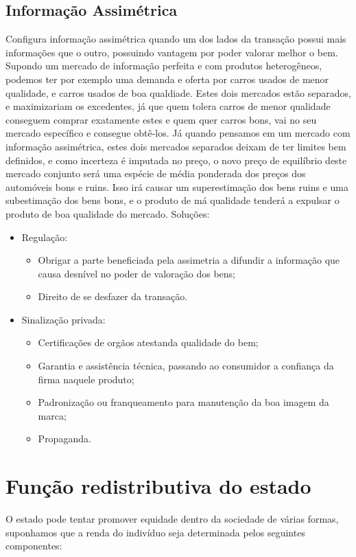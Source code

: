 \documentclass[12pt,a4paper,oneside,brazil]{abntex2}
\begin{document}
\subsection{Informação Assimétrica}
Configura informação assimétrica quando um dos lados da transação possui mais informações que o outro, possuindo vantagem por poder valorar melhor o bem. Supondo um mercado de informação perfeita e com produtos heterogêneos, podemos ter por exemplo uma demanda e oferta por carros usados de menor qualidade, e carros usados de boa qualdiade. Estes dois mercados estão separados, e maximizariam os excedentes, já que quem tolera carros de menor qualidade conseguem comprar exatamente estes e quem quer carros bons, vai no seu mercado específico e consegue obtê-los. Já quando pensamos em um mercado com informação assimétrica, estes dois mercados separados deixam de ter limites bem definidos, e como incerteza é imputada no preço, o novo preço de equilíbrio deste mercado conjunto será uma espécie de média ponderada dos preços dos automóveis bons e ruins. Isso irá causar um superestimação dos bens ruins e uma subestimação dos bens bons, e o produto de má qualidade tenderá a expulsar o produto de boa qualidade do mercado. \newline
Soluções:
\begin{itemize}
\item Regulação:
\begin{itemize}
\item Obrigar a parte beneficiada pela assimetria a difundir a informação que causa desnível no poder de valoração dos bens;
\item Direito de se desfazer da transação.
\end{itemize}
\item Sinalização privada:
\begin{itemize}
\item Certificações de orgãos atestanda qualidade do bem;
\item Garantia e assistência técnica, passando ao consumidor a confiança da firma naquele produto;
\item Padronização ou franqueamento para manutenção da boa imagem da marca;
\item Propaganda.
\end{itemize}
\end{itemize}

\section{Função redistributiva do estado}
O estado pode tentar promover equidade dentro da sociedade de várias formas, suponhamos que a renda do indivíduo seja determinada pelos seguintes componentes:
\end{document}
